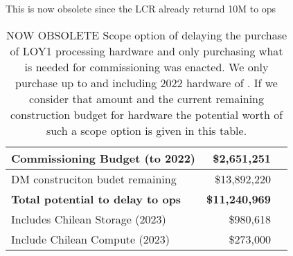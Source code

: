 This is now  obsolete since the LCR already returnd 10M to ops \begin{longtable} { |p{}  |r  |r |} 
\caption{NOW OBSOLETE Scope option of delaying the purchase of LOY1 processing hardware and only purchasing what is needed for commissioning was enacted. We only purchase up to and including 2022 hardware of . If we consider that amount and the current remaining construction budget for hardware the potential worth of such a scope option is given in this table. \label{tab:Scope}}\\ 
\hline 
\textbf{Commissioning Budget (to 2022)  }&\textbf{\$2,651,251} \\ \hline
{DM construciton budet remaining}&{\$13,892,220} \\ \hline
\textbf{Total potential to delay to ops }&\textbf{\$11,240,969} \\ \hline
{Includes Chilean Storage (2023)}&{\$980,618} \\ \hline
{Include Chilean Compute (2023)}&{\$273,000} \\ \hline
\end{longtable} \normalsize
